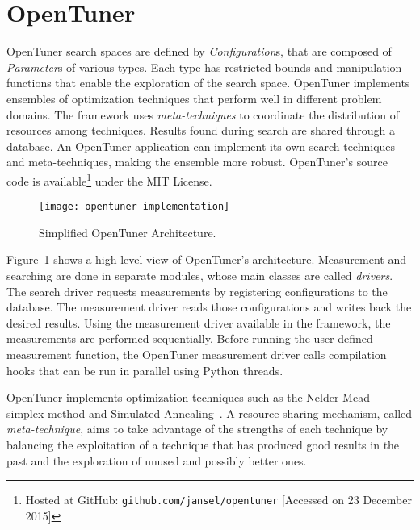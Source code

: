 \section{OpenTuner} \label{sec:ot}

OpenTuner search spaces are defined by \emph{Configuration}s, that are composed
of \emph{Parameter}s of various types. Each type has restricted bounds and
manipulation functions that enable the exploration of the search space.
OpenTuner implements ensembles of optimization techniques that perform well in
different problem domains. The framework uses \emph{meta-techniques} to
coordinate the distribution of resources among techniques.  Results found
during search are shared through a database. An OpenTuner application can
implement its own search techniques and meta-techniques, making the ensemble
more robust.
OpenTuner's source code is available\footnote{Hosted at GitHub:
\texttt{\scriptsize github.com/jansel/opentuner} [Accessed on 23 December 2015]} under the MIT License.

\begin{figure}[htpb]
    \centering
    \texttt{[image: opentuner-implementation]}
    \caption{Simplified OpenTuner Architecture.}
    \label{fig:ot-imp}
\end{figure}

Figure~\ref{fig:ot-imp} shows a high-level view of OpenTuner's architecture.
Measurement and searching are done in separate modules, whose main classes are
called \emph{drivers}. The search driver requests measurements by registering
configurations to the database. The measurement driver reads those
configurations and writes back the desired results. Using the measurement
driver available in the framework, the measurements are performed sequentially.
Before running the user-defined measurement function, the OpenTuner measurement
driver calls compilation hooks that can be run in parallel using Python
threads. 

OpenTuner implements optimization techniques such as the
Nelder-Mead~\cite{nelder1965simplex} simplex method and Simulated
Annealing~\cite{kirkpatrick1983optimization}. A resource sharing mechanism,
called \emph{meta-technique}, aims to take advantage of the strengths of each
technique by balancing the exploitation of a technique that has produced good
results in the past and the exploration of unused and possibly better ones.
